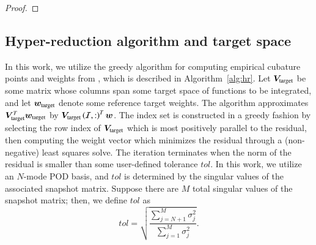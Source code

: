 \documentclass[preprint,10pt]{elsarticle}
\theoremstyle{definition}
\theoremstyle{lemma}
\theoremstyle{theorem}
\theoremstyle{assumption}
\newcommand{\nor}[1]{\left\| #1 \right\|}
\newcommand{\LRp}[1]{\left( #1 \right)}
\begin{document}
\begin{proof}
 \end{proof}
 


\subsection{Hyper-reduction algorithm and target space}
\label{sec:hyperreducalgo}

In this work, we utilize the greedy algorithm for computing empirical cubature points and weights from \cite{an2008optimizing, hernandez2017dimensional}, which is described in Algorithm~\ref{alg:hr}.  Let $\bm{V}_{\rm target}$ be some matrix whose columns span some target space of functions to be integrated, and let $\bm{w}_{\rm target}$ denote some reference target weights.  The algorithm approximates $\bm{V}_{\rm target}^T\bm{w}_{\rm target}$ by $\bm{V}_{\rm target}\LRp{\mathcal{I},:}^T\bm{w}$.  The index set is constructed in a greedy fashion by selecting the row index of $\bm{V}_{\rm target}$ which is most positively parallel to the residual, then computing the weight vector which minimizes the residual through a (non-negative) least squares solve.  The iteration terminates when the norm of the residual is smaller than some user-defined tolerance $tol$.  In this work, we utilize an $N$-mode POD basis, and $tol$ is determined by the singular values of the associated snapshot matrix.  Suppose there are $M$ total singular values of the snapshot matrix; then, we define $tol$ as
\[
tol = \sqrt{\frac{\sum_{j=N+1}^M \sigma_j^2}{\sum_{j=1}^M \sigma_j^2}}.
\]
\end{document}
